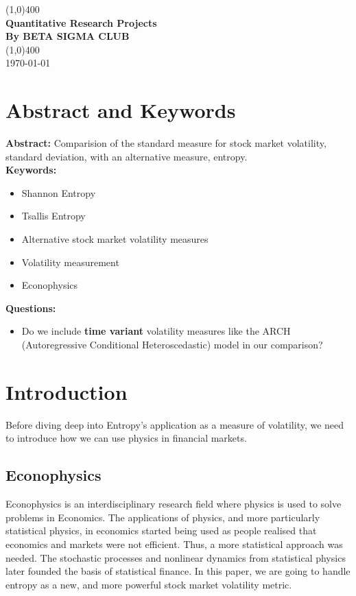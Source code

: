 \documentclass[11pt]{article}
\begin{document}
\begin{titlepage}
\begin{center}
\vspace*{1cm}
\vfill
\line(1,0){400}\\[1mm]
\huge{\textbf{Quantitative Research Projects}}\\[3mm]
\Large{\textbf{By BETA SIGMA CLUB}}\\[1mm]
\line(1,0){400}\\[3mm]
\vfill
\today

\end{center}
\end{titlepage}

\section{Abstract and Keywords}
\textbf{Abstract:} Comparision of the standard measure for stock market volatility, standard deviation, with an alternative measure, entropy. \\

\noindent \textbf{Keywords:}
\begin{itemize}
\item Shannon Entropy
\item Tsallis Entropy
\item Alternative stock market volatility measures
\item Volatility measurement
\item Econophysics
\end{itemize}

\noindent \textbf{Questions:}
\begin{itemize}
\item Do we include \textbf{time variant} volatility measures like the ARCH (Autoregressive Conditional Heteroscedastic) model in our comparison?
\end{itemize}

\newpage
\section{Introduction}
Before diving deep into Entropy's application as a measure of volatility, we need to introduce how we can use physics in financial markets.
\subsection{Econophysics}
Econophysics is an interdisciplinary research field where physics is used to solve problems in Economics. The applications of physics, and more particularly statistical physics, in economics started being used as people realised that economics and markets were not efficient. Thus, a more statistical approach was needed. The stochastic processes and nonlinear dynamics from statistical physics later founded the basis of statistical finance. In this paper, we are going to handle entropy as a new, and more powerful stock market volatility metric. 
\end{document}
